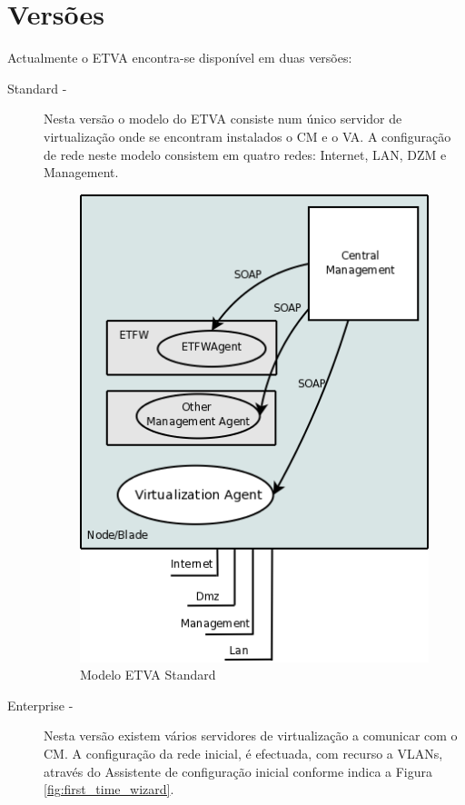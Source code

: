 \section{Versões}

Actualmente o ETVA encontra-se disponível em duas versões:
\begin{description}
	\item[Standard -] Nesta versão o modelo do ETVA consiste num único servidor de virtualização onde se encontram instalados o CM e o VA. A configuração de rede neste modelo consistem em quatro redes: Internet, LAN, DZM e Management.
		\begin{figure}[H]
			\begin{center}
			\includegraphics[scale=0.4]{screenshots/etva_standard.png}
			\caption{Modelo ETVA Standard}
			\label{fig:etva_standard}
			\end{center}
		\end{figure}
	\item[Enterprise -] Nesta versão existem vários servidores de virtualização a comunicar com o CM. A configuração da rede inicial, é efectuada, com recurso a VLANs, através do Assistente de configuração inicial conforme indica a Figura \ref{fig:first_time_wizard}.
		\begin{figure}[H]
			\begin{center}

\end{center}
\end{figure}
\end{description}
